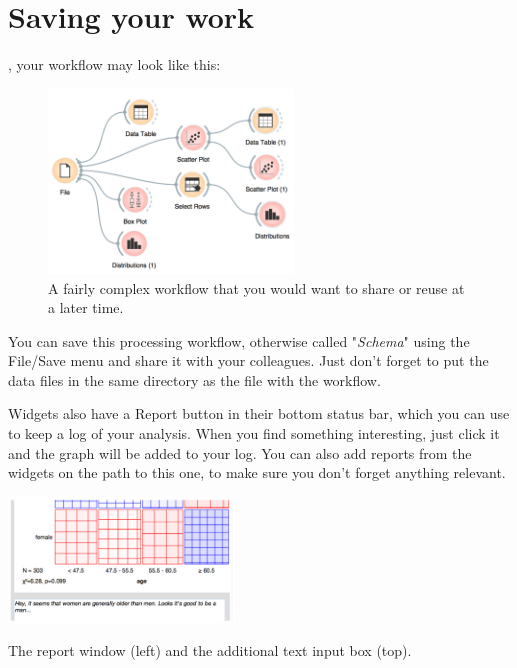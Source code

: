\chapter{Saving your work}
\label{ch:saving_your_work}

, your workflow may look like this:
\begin{figure}[h]
  \centering
  \includegraphics[width=65mm]{saving-fig1.png}%
  \caption{A fairly complex workflow that you would want to share or reuse at a later time.}
  \label{fig:saveing-fig1}
\end{figure}

You can save this processing workflow, otherwise called "\textit{Schema}" using the File/Save menu and share it with your colleagues. Just don't forget to put the data files in the same directory as the file with the workflow.

Widgets also have a Report button in their bottom status bar, which you can use to keep a log of your analysis. When you find something interesting, just click it and the graph  will be added to your log. You can also add reports from the widgets on the path to this one, to make sure you don't forget anything relevant.

\begin{marginfigure}
  \includegraphics[width=60mm]{saving-fig3.png}%
  ~\vspace{1.0cm}
  \caption{The report window (left) and the additional text input box (top).}
  \label{fig:saveing-fig3}
\end{marginfigure}

